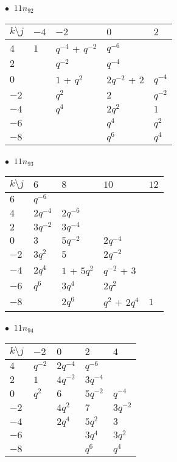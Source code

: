 %
\begin{minipage}{\linewidth}
$\bullet\ $ $11n_{92}$ \vspace{0.5em} \\
\begin{tabular}{l|llll}
$k \setminus j$ & $-4$ & $-2$ & $0$ & $2$ \\
\hline
$4$ & $1$ & $q^{-4}$ + $q^{-2}$ & $q^{-6}$ &  \\
$2$ &  & $q^{-2}$ & $q^{-4}$ &  \\
$0$ &  & $1$ + $q^{2}$ & $2q^{-2}$ + $2$ & $q^{-4}$ \\
$-2$ &  & $q^{2}$ & $2$ & $q^{-2}$ \\
$-4$ &  & $q^{4}$ & $2q^{2}$ & $1$ \\
$-6$ &  &  & $q^{4}$ & $q^{2}$ \\
$-8$ &  &  & $q^{6}$ & $q^{4}$ \\
\end{tabular}
\vspace{2em}
\end{minipage}
%
\begin{minipage}{\linewidth}
$\bullet\ $ $11n_{93}$ \vspace{0.5em} \\
\begin{tabular}{l|llll}
$k \setminus j$ & $6$ & $8$ & $10$ & $12$ \\
\hline
$6$ & $q^{-6}$ &  &  &  \\
$4$ & $2q^{-4}$ & $2q^{-6}$ &  &  \\
$2$ & $3q^{-2}$ & $3q^{-4}$ &  &  \\
$0$ & $3$ & $5q^{-2}$ & $2q^{-4}$ &  \\
$-2$ & $3q^{2}$ & $5$ & $2q^{-2}$ &  \\
$-4$ & $2q^{4}$ & $1$ + $5q^{2}$ & $q^{-2}$ + $3$ &  \\
$-6$ & $q^{6}$ & $3q^{4}$ & $2q^{2}$ &  \\
$-8$ &  & $2q^{6}$ & $q^{2}$ + $2q^{4}$ & $1$ \\
\end{tabular}
\vspace{2em}
\end{minipage}
%
\begin{minipage}{\linewidth}
$\bullet\ $ $11n_{94}$ \vspace{0.5em} \\
\begin{tabular}{l|llll}
$k \setminus j$ & $-2$ & $0$ & $2$ & $4$ \\
\hline
$4$ & $q^{-2}$ & $2q^{-4}$ & $q^{-6}$ &  \\
$2$ & $1$ & $4q^{-2}$ & $3q^{-4}$ &  \\
$0$ & $q^{2}$ & $6$ & $5q^{-2}$ & $q^{-4}$ \\
$-2$ &  & $4q^{2}$ & $7$ & $3q^{-2}$ \\
$-4$ &  & $2q^{4}$ & $5q^{2}$ & $3$ \\
$-6$ &  &  & $3q^{4}$ & $3q^{2}$ \\
$-8$ &  &  & $q^{6}$ & $q^{4}$ \\
\end{tabular}
\vspace{2em}
\end{minipage}
